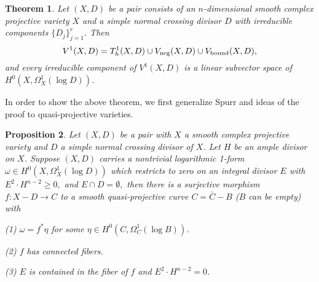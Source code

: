 \documentclass[12pt,reqno]{amsart}
\newtheorem{theorem}{Theorem}
\newtheorem{proposition}[theorem]{Proposition}
\theoremstyle{question}
\theoremstyle{definition}
\theoremstyle{remark}
\theoremstyle{cited}
\theoremstyle{citeddef}
\begin{document}
\begin{theorem} \label{thm:codim1quasiprojective} Let $(X, D)$ be a pair consists of an $n$-dimensional smooth complex projective variety $X$ and a simple normal crossing divisor $D$ with irreducible components $\{D_j\}_{j=1}^r$. Then 
$$
V^1(X,D)= T^1_h(X, D) \cup V_{\textnormal{neg}}(X, D) \cup V_{\textnormal{bound}}(X, D),
$$
and every irreducible component of $V^1(X,D)$ is a linear subvector space of $H^0(X, \Omega_X^1(\log D))$. 
\end{theorem}

In order to show the above theorem, we first generalize Spurr \cite[Theorem 2]{Sp88} and ideas of the proof to quasi-projective varieties. 

\begin{proposition} \label{Prop:Spurr-no-intersection}
Let $(X, D)$ be a pair with $X$ a smooth complex projective variety and $D$ a simple normal crossing divisor of $X$. Let $H$ be an ample divisor on $X$. Suppose $(X, D)$ carries a nontrivial logarithmic 1-form $\omega\in H^0(X, \Omega_X^1(\log D))$  which restricts to zero on an integral divisor $E$ with $E^2\cdot H^{n-2}\geq0,$ and $E\cap D=\emptyset,$ then there is a surjective morphism $f: X-D\to C$ to a smooth quasi-projective curve $C=\bar{C}-B$ ($B$ can be empty) with 

(1)  $\omega=f^*\eta$ for some $\eta\in H^0(C, \Omega_C^1(\log B))$.

(2) $f$ has connected fibers.

(3) $E$ is contained in the fiber of $f$ and $E^2\cdot H^{n-2}=0$.
\end{proposition}
\end{document}
